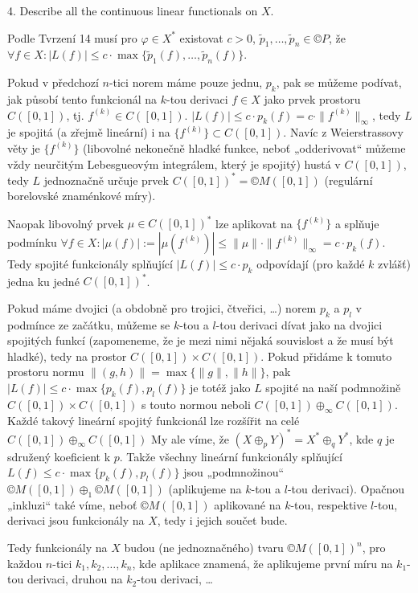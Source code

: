 \documentclass[12pt]{article}					%
\begin{document}
\begin{priklad}[11]
	4. Describe all the continuous linear functionals on $X$.

	\begin{reseni}
		Podle Tvrzení 14 musí pro $φ \in X^*$ existovat $c > 0$, $\tilde p_1, …, \tilde p_n \in ©P$, že $\forall f \in X: |L(f)| ≤ c·\max\{\tilde p_1(f), …, \tilde p_n(f)\}$.

		Pokud v předchozí $n$-tici norem máme pouze jednu, $p_k$, pak se můžeme podívat, jak působí tento funkcionál na $k$-tou derivaci $f \in X$ jako prvek prostoru $C([0, 1])$, tj. $f^{(k)} \in C([0, 1])$. $|L(f)| ≤ c·p_k(f) = c·\|f^{(k)}\|_∞$, tedy $L$ je spojitá (a zřejmě lineární) i na $\{f^{(k)}\} \subset C([0, 1])$. Navíc z Weierstrassovy věty je $\{f^{(k)}\}$ (libovolné nekonečně hladké funkce, neboť „odderivovat“ můžeme vždy neurčitým Lebesgueovým integrálem, který je spojitý) hustá v $C([0, 1])$, tedy $L$ jednoznačně určuje prvek $C([0, 1])^* = ©M([0, 1])$ (regulární borelovské znaménkové míry).

		Naopak libovolný prvek $μ \in C([0, 1])^*$ lze aplikovat na $\{f^{(k)}\}$ a splňuje podmínku $\forall f \in X: |μ(f)| := |μ(f^{(k)})| ≤ \|μ\| · \|f^{(k)}\|_∞ = c·p_k(f)$. Tedy spojité funkcionály splňující $|L(f)| ≤ c·p_k$ odpovídají (pro každé $k$ zvlášť) jedna ku jedné $C([0, 1])^*$.

		Pokud máme dvojici (a obdobně pro trojici, čtveřici, …) norem $p_k$ a $p_l$ v podmínce ze začátku, můžeme se $k$-tou a $l$-tou derivaci dívat jako na dvojici spojitých funkcí (zapomeneme, že je mezi nimi nějaká souvislost a že musí být hladké), tedy na prostor $C([0, 1]) \times C([0, 1])$. Pokud přidáme k tomuto prostoru normu $\|(g, h)\| = \max\{\|g\|, \|h\|\}$, pak $|L(f)| ≤ c·\max\{p_k(f), p_l(f)\}$ je totéž jako $L$ spojité na naší podmnožině $C([0, 1]) \times C([0, 1])$ s touto normou neboli $C([0, 1]) \oplus_∞ C([0, 1])$. Každé takový lineární spojitý funkcionál lze rozšířit na celé $C([0, 1]) \oplus_∞ C([0, 1])$ My ale víme, že $(X \oplus_p Y)^* = X^* \oplus_q Y^*$, kde $q$ je sdružený koeficient k $p$. Takže všechny lineární funkcionály splňující $L(f) ≤ c·\max\{p_k(f), p_l(f)\}$ jsou „podmnožinou“ $©M([0, 1]) \oplus_1 ©M([0, 1])$ (aplikujeme na $k$-tou a $l$-tou derivaci). Opačnou „inkluzi“ také víme, neboť $©M([0, 1])$ aplikované na $k$-tou, respektive $l$-tou, derivaci jsou funkcionály na $X$, tedy i jejich součet bude.

		Tedy funkcionály na $X$ budou (ne jednoznačného) tvaru $©M([0, 1])^n$, pro každou $n$-tici $k_1, k_2, …, k_n$, kde aplikace znamená, že aplikujeme první míru na $k_1$-tou derivaci, druhou na $k_2$-tou derivaci, …
	\end{reseni}
\end{priklad}
\end{document}
